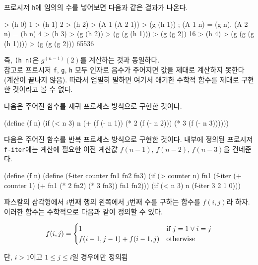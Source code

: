 프로시저 \texttt{h}에 임의의 수를 넣어보면 다음과 같은 결과가 나온다.

\begin{lisp}
> (h 0)
1
> (h 1)
2
> (h 2)
> (A 1 (A 2 1))
> (g (h 1))        ; (A 1 n) = (g n), (A 2 n) = (h n)
4
> (h 3)
> (g (h 2))
> (g (g (h 1)))
> (g (g 2))
16
> (h 4)
> (g (g (g (h 1))))
> (g (g (g 2)))
65536
\end{lisp}

즉, \texttt{(h~n)}은 $g^{(n-1)}(2)$를 계산하는 것과 동일하다.\\

참고로 프로시저 \texttt{f}, \texttt{g}, \texttt{h} 모두 인자로 음수가 주어지면
값을 제대로 계산하지 못한다 (계산이 끝나지 않음). 따라서 엄밀히 말하면 여기서
애기한 수학적 함수를 제대로 구현한 것이라고 볼 수 없다.


다음은 주어진 함수를 재귀 프로세스 방식으로 구현한 것이다.

\begin{lisp}
(define (f n)
  (if (< n 3)
      n
      (+ (f (- n 1))
         (* 2 (f (- n 2)))
         (* 3 (f (- n 3))))))
\end{lisp}

다음은 주어진 함수를 반복 프로세스 방식으로 구현한 것이다. 내부에 정의된
프로시저 \texttt{f-iter}에는 계산에 필요한 이전 계산값 $f(n-1)$, $f(n-2)$,
$f(n-3)$을 건네준다.

\begin{lisp}
(define (f n)
  (define (f-iter counter fn1 fn2 fn3)
    (if (> counter n)
        fn1
        (f-iter (+ counter 1)
                (+ fn1 (* 2 fn2) (* 3 fn3))
                fn1
                fn2)))
  (if (< n 3)
      n
      (f-iter 3 2 1 0)))
\end{lisp}


파스칼의 삼각형에서 $i$번째 행의 왼쪽에서 $j$번째 수를 구하는 함수를 $f(i,j)$라
하자. 이러한 함수는 수학적으로 다음과 같이 정의할 수 있다.

\begin{equation}\notag
  f(i,j) =
  \begin{cases}
    1                    & \text{if } j=1 \vee i=j\\
    f(i-1,j-1) + f(i-1,j) & \text{otherwise}
  \end{cases}
\end{equation}
\begin{center}
  \qquad\qquad\qquad 단, $i>1$이고 $1\le j \le i$일 경우에만 정의됨
\end{center}

